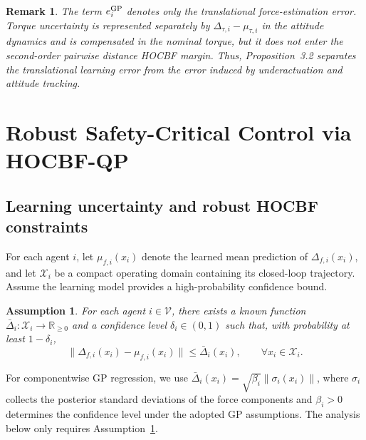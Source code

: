 \documentclass[journal,twoside,web]{ieeecolor}
\newtheorem{remark}[theorem]{Remark}
\newtheorem{assumption}[theorem]{Assumption}
\begin{document}
\begin{remark}
The term \(e_i^{\rm GP}\) denotes only the translational
force-estimation error. Torque uncertainty is represented separately
by \(\Delta_{\tau,i}-\mu_{\tau,i}\) in the attitude dynamics and is
compensated in the nominal torque, but it does not enter the
second-order pairwise distance HOCBF margin. Thus,
Proposition~3.2 separates the translational learning error from the
error induced by underactuation and attitude tracking.
\end{remark}

\section{Robust Safety-Critical Control via HOCBF-QP}
\label{sec:robust_safety_filter}


\subsection{Learning uncertainty and robust HOCBF constraints}
\label{subsec:learning_uncertainty_hocbf}


For each agent $i$, let $\mu_{f,i}(x_i)$ denote the learned mean
prediction of $\Delta_{f,i}(x_i)$, and let $\mathcal X_i$ be a compact
operating domain containing its closed-loop trajectory. Assume the
learning model provides a high-probability confidence bound.
\begin{assumption}
\label{ass:gp_force_bound}
For each agent $i\in\mathcal V$, there exists a known function
$\bar\Delta_i:\mathcal X_i\rightarrow\mathbb R_{\geq0}$ and
a confidence level $\delta_i\in(0,1)$ such that, with probability at least $1-\delta_i$,
\begin{equation}
    \|\Delta_{f,i}(x_i)-\mu_{f,i}(x_i)\|
    \leq
    \bar\Delta_i(x_i),
    \qquad
    \forall x_i\in\mathcal X_i.
    \label{eq:force_confidence_bound}
\end{equation}
\end{assumption}

\medskip

For componentwise GP regression, we use
$\bar\Delta_i(x_i)=\sqrt{\beta_i}\|\sigma_i(x_i)\|$,
where $\sigma_i$ collects the posterior standard deviations
of the force components and $\beta_i>0$ determines the
confidence level under the adopted GP assumptions. The analysis below only requires
Assumption~\ref{ass:gp_force_bound}.
\end{document}
